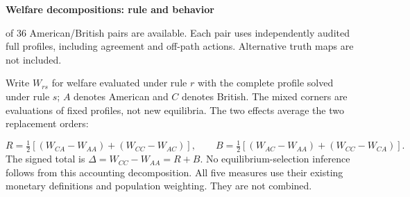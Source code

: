 \documentclass[10pt]{article}
\begin{document}
{\LARGE\bfseries Welfare decompositions: rule and behavior}\par{} of 36 American/British pairs are available. Each pair uses independently audited full profiles, including agreement and off-path actions. Alternative truth maps are not included.\par\smallskip
Write $W_{rs}$ for welfare evaluated under rule $r$ with the complete profile solved under rule $s$; $A$ denotes American and $C$ denotes British. The mixed corners are evaluations of fixed profiles, not new equilibria. The two effects average the two replacement orders:\par
\[R=\tfrac12[(W_{CA}-W_{AA})+(W_{CC}-W_{AC})],\qquad B=\tfrac12[(W_{AC}-W_{AA})+(W_{CC}-W_{CA})].\]
The signed total is $\Delta=W_{CC}-W_{AA}=R+B$. No equilibrium-selection inference follows from this accounting decomposition. All five measures use their existing monetary definitions and population weighting. They are not combined.\par\medskip
\end{document}
